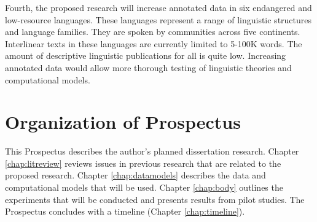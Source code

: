 Fourth, the proposed research will increase annotated data in six endangered and low-resource languages. These languages represent a range of linguistic structures and language families. They are spoken by communities across five continents. Interlinear texts in these languages are currently limited to 5-100K words. The amount of descriptive linguistic publications for all is quite low. Increasing annotated data would allow more thorough testing of linguistic theories and computational models.

\section{Organization of Prospectus}

This Prospectus describes the author's planned dissertation research. Chapter \ref{chap:litreview} reviews issues in previous research that are related to the proposed research. Chapter \ref{chap:datamodels} describes the data and computational models that will be used. Chapter \ref{chap:body} outlines the experiments that will be conducted and presents results from pilot studies. The Prospectus concludes with a timeline (Chapter \ref{chap:timeline}). %

